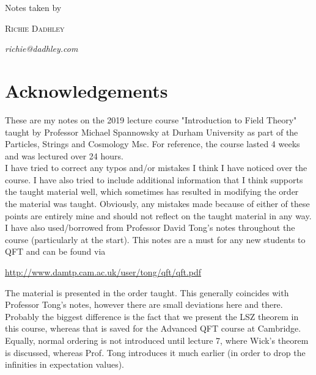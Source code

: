 \documentclass[11pt,oneside]{book}
\theoremstyle{definition} %
\theoremstyle{plain} %
\theoremstyle{remark} %
\theoremstyle{underline}
\begin{document}
\begin{titlepage}
	    \vspace{3\baselineskip}

	    Notes taken by 
	
	    \vspace{0.5\baselineskip} %
	
	    {\scshape\Large Richie Dadhley} %
	   
	    \vspace{0.5\baselineskip} %
	    \textit{richie@dadhley.com} %
	
	    \vfill %
\end{titlepage}




\newpage
\section*{Acknowledgements}

These are my notes on the 2019 lecture course "Introduction to Field Theory" taught by Professor Michael Spannowsky at Durham University as part of the Particles, Strings and Cosmology Msc. For reference, the course lasted 4 weeks and was lectured over 24 hours. \\

I have tried to correct any typos and/or mistakes I think I have noticed over the course. I have also tried to include additional information that I think supports the taught material well, which sometimes has resulted in modifying the order the material was taught. Obviously, any mistakes made because of either of these points are entirely mine and should not reflect on the taught material in any way. \\

I have also used/borrowed from Professor David Tong's notes throughout the course (particularly at the start). This notes are a must for any new students to QFT and can be found via 

\begin{center}
    \href{http://www.damtp.cam.ac.uk/user/tong/qft/qft.pdf}{http://www.damtp.cam.ac.uk/user/tong/qft/qft.pdf}
\end{center}

The material is presented in the order taught. This generally coincides with Professor Tong's notes, however there are small deviations here and there. Probably the biggest difference is the fact that we present the LSZ theorem in this course, whereas that is saved for the Advanced QFT course at Cambridge. Equally, normal ordering is not introduced until lecture 7, where Wick's theorem is discussed, whereas Prof. Tong introduces it much earlier (in order to drop the infinities in expectation values). 
\end{document}
